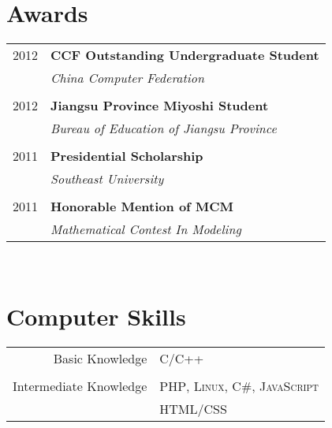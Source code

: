 \documentclass[UTF8,10pt]{article} %
\begin{document}
{\begin{minipage}[t]{0.44\textwidth}
\section{Awards} 

\begin{tabular}{rl}
2012	 & \textbf{CCF Outstanding Undergraduate Student}\\
& \textit{China Computer Federation}\\ \\



2012	 & \textbf{Jiangsu Province Miyoshi Student}\\
&  \textit{Bureau of Education of Jiangsu Province}\\ \\

2011 & \textbf{Presidential Scholarship}\\
& \textit{Southeast University} \\ \\

2011	 & \textbf{Honorable Mention of MCM}\\
& \textit{Mathematical Contest In Modeling}\\ 

\end{tabular}\\[10pt]


\section{Computer Skills} 

\begin{tabular}{rl}
Basic Knowledge
& \textsc{C/C++}\\ 
& \\
Intermediate Knowledge
& \textsc{PHP}, \textsc{Linux}, \textsc{C\#}, \textsc{JavaScript}\\
&\textsc{HTML/CSS}\\ 
\end{tabular}



\end{minipage}}
\end{document}
